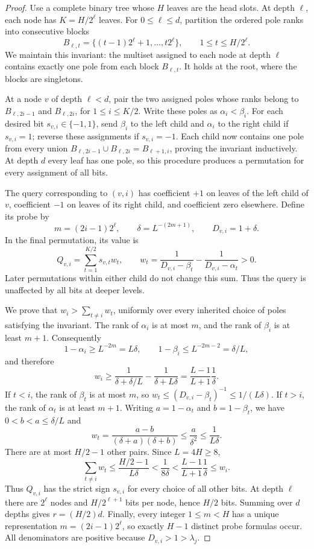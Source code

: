 \documentclass[11pt]{article}
\begin{document}
\begin{proof}
Use a complete binary tree whose $H$ leaves are the head slots. At
depth $\ell$, each node has $K=H/2^\ell$ leaves. For
$0\leq\ell\leq d$, partition the ordered pole ranks into consecutive
blocks
\[
 B_{\ell,t}=\{(t-1)2^\ell+1,\ldots,t2^\ell\},
 \qquad 1\leq t\leq H/2^\ell.
\]
We maintain this invariant: the multiset assigned to each node at
depth $\ell$ contains exactly one pole from each block
$B_{\ell,t}$. It holds at the root, where the blocks are singletons.

At a node $v$ of depth $\ell<d$, pair the two assigned poles whose
ranks belong to $B_{\ell,2i-1}$ and $B_{\ell,2i}$, for
$1\leq i\leq K/2$. Write these poles as $\alpha_i<\beta_i$.
For each desired bit $s_{v,i}\in\{-1,1\}$, send $\beta_i$ to the
left child and $\alpha_i$ to the right child if $s_{v,i}=1$;
reverse these assignments if $s_{v,i}=-1$. Each child now contains
one pole from every union
$B_{\ell,2i-1}\cup B_{\ell,2i}=B_{\ell+1,i}$, proving the
invariant inductively. At depth $d$ every leaf has one pole, so this
procedure produces a permutation for every assignment of all bits.

The query corresponding to $(v,i)$ has coefficient $+1$ on leaves
of the left child of $v$, coefficient $-1$ on leaves of its right
child, and coefficient zero elsewhere. Define its probe by
\[
 m=(2i-1)2^\ell,\qquad
 \delta=L^{-(2m+1)},\qquad D_{v,i}=1+\delta.
\]
In the final permutation, its value is
\[
 Q_{v,i}=\sum_{t=1}^{K/2}s_{v,t}w_t,\qquad
 w_t=\frac1{D_{v,i}-\beta_t}
       -\frac1{D_{v,i}-\alpha_t}>0.
\]
Later permutations within either child do not change this sum. Thus
the query is unaffected by all bits at deeper levels.

We prove that $w_i>\sum_{t\ne i}w_t$, uniformly over every inherited
choice of poles satisfying the invariant. The rank of $\alpha_i$
is at most $m$, and the rank of $\beta_i$ is at least $m+1$.
Consequently
\[
 1-\alpha_i\geq L^{-2m}=L\delta,\qquad
 1-\beta_i\leq L^{-2m-2}=\delta/L,
\]
and therefore
\[
 w_i\geq\frac1{\delta+\delta/L}
          -\frac1{\delta+L\delta}
 =\frac{L-1}{L+1}\frac1\delta.
\]
If $t<i$, the rank of $\beta_t$ is at most $m$, so
$w_t\leq (D_{v,i}-\beta_t)^{-1}\leq1/(L\delta)$.
If $t>i$, the rank of $\alpha_t$ is at least $m+1$. Writing
$a=1-\alpha_t$ and $b=1-\beta_t$, we have
$0<b<a\leq\delta/L$ and
\[
 w_t=\frac{a-b}{(\delta+a)(\delta+b)}
 \leq\frac{a}{\delta^2}\leq\frac1{L\delta}.
\]
There are at most $H/2-1$ other pairs. Since $L=4H\geq8$,
\[
 \sum_{t\ne i}w_t\leq\frac{H/2-1}{L\delta}
 <\frac1{8\delta}
 <\frac{L-1}{L+1}\frac1\delta\leq w_i.
\]
Thus $Q_{v,i}$ has the strict sign $s_{v,i}$ for every choice of all
other bits. At depth $\ell$ there are $2^\ell$ nodes and
$H/2^{\ell+1}$ bits per node, hence $H/2$ bits. Summing over
$d$ depths gives $r=(H/2)d$. Finally, every integer
$1\leq m<H$ has a unique representation
$m=(2i-1)2^\ell$, so exactly $H-1$ distinct probe formulas occur.
All denominators are positive because $D_{v,i}>1>\lambda_j$.
\end{proof}
\end{document}
